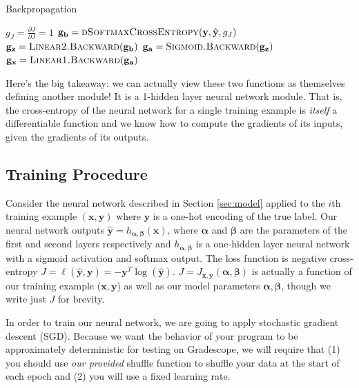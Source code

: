 \documentclass[11pt,addpoints,answers]{exam}
\newcommand{\av}{\mathbf{a}}
\newcommand{\bv}{\mathbf{b}}
\newcommand{\gv}{\mathbf{g}}
\newcommand{\xv}{\mathbf{x}}
\newcommand{\yv}{\mathbf{y}}
\newcommand{\zv}{\mathbf{z}}
\newcommand{\alphav     }{\boldsymbol \alpha     }
\newcommand{\betav      }{\boldsymbol \beta      }
\begin{document}
\begin{algorithm}[H]
  \caption{Backpropagation}
  \label{alg:backpropmodule}
  \begin{algorithmic}[1] %
    \Procedure{NNBackward}{$\yv$, $\hat{\yv}$}
      \State $g_J = \frac{\partial J}{\partial J} = 1$ 
      \State $\gv_{\bv} = \textproc{dSoftmaxCrossEntropy}(\yv, \hat{\yv}, g_J)$ 
      \State $\gv_{\zv} = \textproc{Linear2.Backward}(\gv_{\bv})$
      \State $\gv_{\av} = \textproc{Sigmoid.Backward}(\gv_{\zv})$
      \State $\gv_{\xv} = \textproc{Linear1.Backward}(\gv_{\av})$ \Comment{We discard $\gv_{\xv}$}
    \EndProcedure
  \end{algorithmic}
\end{algorithm}

Here's the big takeaway: we can actually view these two functions as themselves defining another module! It is a 1-hidden layer neural network module. That is, the cross-entropy of the neural network for a single training example is \emph{itself} a differentiable function and we know how to compute the gradients of its inputs, given the gradients of its outputs. 

\subsection{Training Procedure}
\label{sec:sgd}

Consider the neural network described in Section \ref{sec:model} applied to the $i$th training example $(\xv, \yv)$ where $\yv$ is a one-hot encoding of the true label. Our neural network outputs $\hat{\yv} = h_{\alphav, \betav}(\xv)$, where $\alphav$ and $\betav$ are the parameters of the first and second layers respectively and $h_{\alphav, \betav}$ is a one-hidden layer neural network with a sigmoid activation and softmax output. The loss function is negative cross-entropy $J = \ell(\hat{\yv}, \yv) = - \yv^T \log(\hat{\yv})$. $J = J_{\xv, \yv}(\alphav, \betav)$ is actually a function of our training example ($\xv, \yv$) as well as our model parameters $\alphav, \betav$, though we write just $J$ for brevity.

In order to train our neural network, we are going to apply stochastic gradient descent (SGD). Because we want the behavior of your program to be approximately deterministic for testing on Gradescope, we will require that (1) you should use \emph{our provided} shuffle function to shuffle your data at the start of each epoch and (2) you will use a fixed learning rate.
\end{document}
